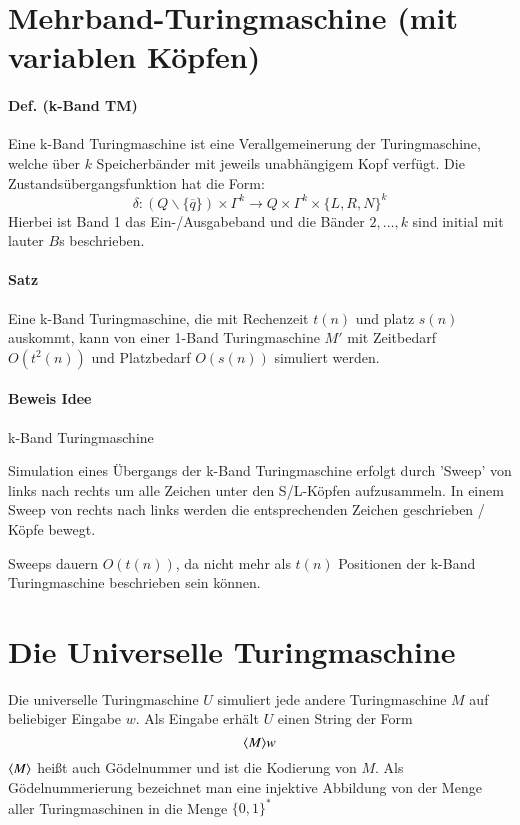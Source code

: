 \section{Mehrband-Turingmaschine (mit variablen Köpfen)}

\paragraph*{Def. (k-Band TM)} Eine k-Band Turingmaschine ist eine Verallgemeinerung der Turingmaschine, welche über $k$ Speicherbänder mit jeweils unabhängigem Kopf verfügt. Die Zustandsübergangsfunktion hat die Form: $$ \delta : (Q\backslash\{\overline{q}\}) \times \Gamma^k \rightarrow Q \times \Gamma^k \times \{L,R,N\}^k $$ Hierbei ist Band 1 das Ein-/Ausgabeband und die Bänder $2,\dots,k$ sind initial mit lauter $B$s beschrieben.

\paragraph*{Satz} Eine k-Band Turingmaschine, die mit Rechenzeit $t(n)$ und platz $s(n)$ auskommt, kann von einer 1-Band Turingmaschine $M'$ mit Zeitbedarf $O(t^2(n))$ und Platzbedarf $O(s(n))$ simuliert werden.

\paragraph*{Beweis Idee} k-Band Turingmaschine %

Simulation eines Übergangs der k-Band Turingmaschine erfolgt durch 'Sweep' von links nach rechts um alle Zeichen unter den S/L-Köpfen aufzusammeln. In einem Sweep von rechts nach links werden die entsprechenden Zeichen geschrieben / Köpfe bewegt.

\par\medskip
Sweeps dauern $O(t(n))$, da nicht mehr als $t(n)$ Positionen der k-Band Turingmaschine beschrieben sein können.\par\medskip

\section{Die Universelle Turingmaschine}
Die universelle Turingmaschine $U$ simuliert jede andere Turingmaschine $M$ auf beliebiger Eingabe $w$. Als Eingabe erhält $U$ einen String der Form $$\langle M \rangle w$$ $\langle M \rangle$ heißt auch Gödelnummer und ist die Kodierung von $M$. Als Gödelnummerierung bezeichnet man eine injektive Abbildung von der Menge aller Turingmaschinen in die Menge $\{0,1\}^*$


